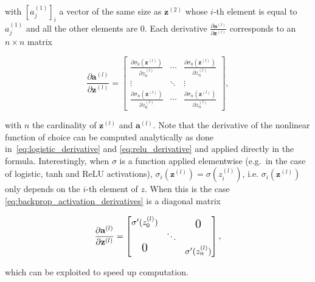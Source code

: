 \noindent with $[a_{j}^{(1)}]_i$ a vector of the same size as $\mathbf{z}^{(2)}$
whose $i$-th element is equal to $a_j^{(1)}$ and all the other elements are
$0$. Each derivative $\frac{\partial \mathbf{a}^{(l)}}{\partial
\mathbf{z}^{(l)}}$ corresponds to an $n \times n$ matrix

\begin{equation}\label{eq:backprop_activation_derivatives}
    \frac{\partial \mathbf{a}^{(l)}}{\partial \mathbf{z}^{(l)}} =
    \begin{bmatrix}
        \frac{\partial \sigma_{0}(\mathbf{z}^{(l)})}
             {\partial z^{(l)}_{0}} & \cdots &
        \frac{\partial \sigma_{0}(\mathbf{z}^{(l)})}
             {\partial z^{(l)}_{n}} \\
        \vdots & \ddots & \vdots \\
        \frac{\partial \sigma_{n}(\mathbf{z}^{(l)})}
             {\partial z^{(l)}_{0}} & \cdots &
        \frac{\partial \sigma_{n}(\mathbf{z}^{(l)})}
             {\partial z^{(l)}_{n}}
    \end{bmatrix},
\end{equation}

\noindent with $n$ the cardinality of $\mathbf{z}^{(l)}$ and
$\mathbf{a}^{(l)}$. Note that the derivative of the nonlinear function of
choice can be computed analytically as done in~\autoref{eq:logistic_derivative}
and \autoref{eq:relu_derivative} and applied directly in the formula.
Interestingly, when $\sigma$ is a function applied elementwise (e.g.\ in the
case of logistic, tanh and ReLU activations),
$\sigma_{i}(\mathbf{z}^{(l)})=\sigma(z_{i}^{(l)})$, i.e.
$\sigma_{i}(\mathbf{z}^{(l)})$ only depends on the $i$-th element of $z$. When
this is the case \autoref{eq:backprop_activation_derivatives} is a diagonal
matrix

\begin{equation}\label{eq:backprop_activation_derivatives}
    \frac{\partial \mathbf{a}^{(l)}}{\partial \mathbf{z}^{(l)}} =
    \begin{bmatrix}
        \sigma'(z_{0}^{(l)}) & & \text{\raisebox{-0.75ex}{\Large 0}} \\
        & \ddots & \\
        \text{\raisebox{0.75ex}{\Large 0}}
        & & \sigma'(z_{n}^{(l)})
    \end{bmatrix},
\end{equation}

\noindent which can be exploited to speed up computation.



